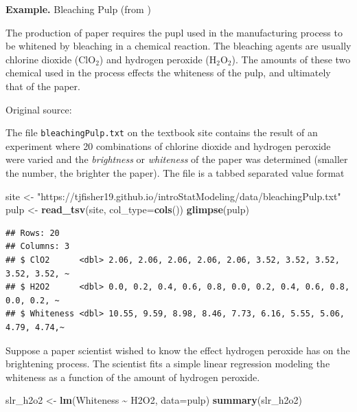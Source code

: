\documentclass[
]{book}
\newenvironment{Shaded}{\begin{snugshade}}{\end{snugshade}}
\newcommand{\AttributeTok}[1]{\textcolor[rgb]{0.13,0.29,0.53}{#1}}
\newcommand{\FunctionTok}[1]{\textcolor[rgb]{0.13,0.29,0.53}{\textbf{#1}}}
\newcommand{\NormalTok}[1]{#1}
\newcommand{\OtherTok}[1]{\textcolor[rgb]{0.56,0.35,0.01}{#1}}
\newcommand{\SpecialCharTok}[1]{\textcolor[rgb]{0.81,0.36,0.00}{\textbf{#1}}}
\newcommand{\StringTok}[1]{\textcolor[rgb]{0.31,0.60,0.02}{#1}}
\begin{document}
\textbf{Example.} Bleaching Pulp (from \citet{WeissText})

The production of paper requires the pupl used in the manufacturing process to be whitened by bleaching in a chemical reaction.
The bleaching agents are usually chlorine dioxide (ClO\(_2\)) and hydrogen peroxide (H\(_2\)O\(_2\)).
The amounts of these two chemical used in the process effects the whiteness of the pulp, and ultimately that of the paper.

Original source: \citet{Zhou1998}

The file \texttt{bleachingPulp.txt} on the textbook site contains the result of an experiment where 20 combinations of chlorine dioxide and hydrogen peroxide were varied and the \emph{brightness} or \emph{whiteness} of the paper was determined (smaller the number, the brighter the paper).
The file is a tabbed separated value format

\begin{Shaded}
\begin{Highlighting}[]
\NormalTok{site }\OtherTok{\textless{}{-}} \StringTok{"https://tjfisher19.github.io/introStatModeling/data/bleachingPulp.txt"}
\NormalTok{pulp }\OtherTok{\textless{}{-}} \FunctionTok{read\_tsv}\NormalTok{(site, }\AttributeTok{col\_type=}\FunctionTok{cols}\NormalTok{())}
\FunctionTok{glimpse}\NormalTok{(pulp)}
\end{Highlighting}
\end{Shaded}

\begin{verbatim}
## Rows: 20
## Columns: 3
## $ ClO2      <dbl> 2.06, 2.06, 2.06, 2.06, 2.06, 3.52, 3.52, 3.52, 3.52, 3.52, ~
## $ H2O2      <dbl> 0.0, 0.2, 0.4, 0.6, 0.8, 0.0, 0.2, 0.4, 0.6, 0.8, 0.0, 0.2, ~
## $ Whiteness <dbl> 10.55, 9.59, 8.98, 8.46, 7.73, 6.16, 5.55, 5.06, 4.79, 4.74,~
\end{verbatim}

Suppose a paper scientist wished to know the effect hydrogen peroxide has on the brightening process.
The scientist fits a simple linear regression modeling the whiteness as a function of the amount of hydrogen peroxide.

\begin{Shaded}
\begin{Highlighting}[]
\NormalTok{slr\_h2o2 }\OtherTok{\textless{}{-}} \FunctionTok{lm}\NormalTok{(Whiteness }\SpecialCharTok{\textasciitilde{}}\NormalTok{ H2O2, }\AttributeTok{data=}\NormalTok{pulp)}
\FunctionTok{summary}\NormalTok{(slr\_h2o2)}
\end{Highlighting}
\end{Shaded}
\end{document}
